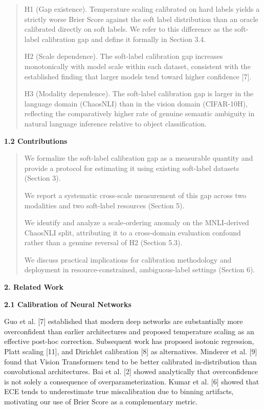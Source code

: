 \documentclass[11pt]{article}
\begin{document}
\begin{quote}
H1 (Gap existence). Temperature scaling calibrated on hard labels yields
a strictly worse Brier Score against the soft label distribution than an
oracle calibrated directly on soft labels. We refer to this difference
as the soft-label calibration gap and define it formally in Section 3.4.

H2 (Scale dependence). The soft-label calibration gap increases
monotonically with model scale within each dataset, consistent with the
established finding that larger models tend toward higher confidence
{[}7{]}.

H3 (Modality dependence). The soft-label calibration gap is larger in
the language domain (ChaosNLI) than in the vision domain (CIFAR-10H),
reflecting the comparatively higher rate of genuine semantic ambiguity
in natural language inference relative to object classification.
\end{quote}

\textbf{1.2 Contributions}

\begin{quote}
We formalize the soft-label calibration gap as a measurable quantity and
provide a protocol for estimating it using existing soft-label datasets
(Section 3).

We report a systematic cross-scale measurement of this gap across two
modalities and two soft-label resources (Section 5).

We identify and analyze a scale-ordering anomaly on the MNLI-derived
ChaosNLI split, attributing it to a cross-domain evaluation confound
rather than a genuine reversal of H2 (Section 5.3).

We discuss practical implications for calibration methodology and
deployment in resource-constrained, ambiguous-label settings (Section
6).
\end{quote}

\textbf{2. Related Work}

\textbf{2.1 Calibration of Neural Networks}

Guo et al. {[}7{]} established that modern deep networks are
substantially more overconfident than earlier architectures and proposed
temperature scaling as an effective post-hoc correction. Subsequent work
has proposed isotonic regression, Platt scaling {[}11{]}, and Dirichlet
calibration {[}8{]} as alternatives. Minderer et al. {[}9{]} found that
Vision Transformers tend to be better calibrated in-distribution than
convolutional architectures. Bai et al. {[}2{]} showed analytically that
overconfidence is not solely a consequence of overparameterization.
Kumar et al. {[}6{]} showed that ECE tends to underestimate true
miscalibration due to binning artifacts, motivating our use of Brier
Score as a complementary metric.
\end{document}
